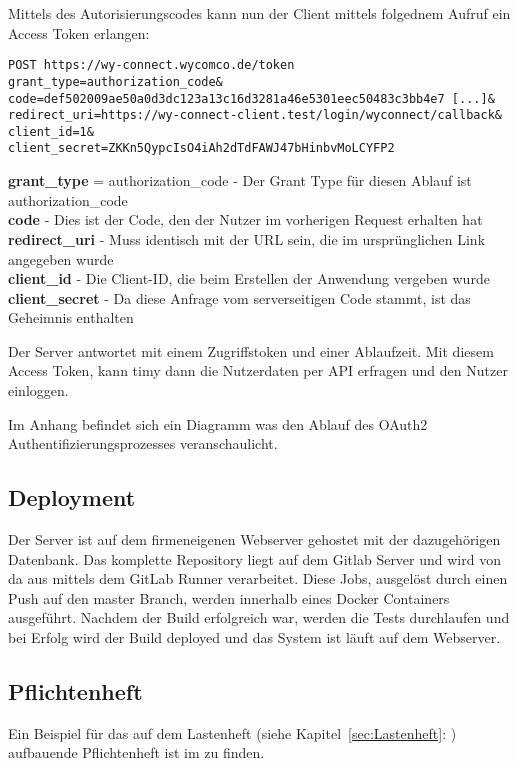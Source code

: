 Mittels des Autorisierungscodes kann nun der Client mittels folgednem Aufruf ein Access Token erlangen: 

\texttt{POST https://wy-connect.wycomco.de/token \\
  grant\_type=authorization\_code\& \\
  code=def502009ae50a0d3dc123a13c16d3281a46e5301eec50483c3bb4e7 [...]\& \\
  redirect\_uri=https://wy-connect-client.test/login/wyconnect/callback\& \\
  client\_id=1\& \\
  client\_secret=ZKKn5QypcIsO4iAh2dTdFAWJ47bHinbvMoLCYFP2}
  
\textbf{grant\_type} = authorization\_code - Der Grant Type für diesen Ablauf ist authorization\_code \\
\textbf{code} - Dies ist der Code, den der Nutzer im vorherigen Request erhalten hat \\
\textbf{redirect\_uri} - Muss identisch mit der URL sein, die im ursprünglichen Link angegeben wurde \\
\textbf{client\_id} - Die Client-ID, die beim Erstellen der Anwendung vergeben wurde \\
\textbf{client\_secret} - Da diese Anfrage vom serverseitigen Code stammt, ist das Geheimnis enthalten

Der Server antwortet mit einem Zugriffstoken und einer Ablaufzeit. Mit diesem Access Token, kann timy dann die Nutzerdaten per API erfragen und den Nutzer einloggen.

Im Anhang  befindet sich ein Diagramm was den Ablauf des OAuth2 Authentifizierungsprozesses veranschaulicht. 

\subsection{Deployment}
\label{sec:Deployment}

Der Server ist auf dem firmeneigenen Webserver gehostet mit der dazugehörigen Datenbank. Das komplette Repository liegt auf dem Gitlab Server und wird von da aus mittels dem GitLab Runner verarbeitet. Diese Jobs, ausgelöst durch einen Push auf den master Branch, werden innerhalb eines Docker Containers ausgeführt. Nachdem der Build erfolgreich war, werden die Tests durchlaufen und bei Erfolg wird der Build deployed und das System ist läuft auf dem Webserver.

\subsection{Pflichtenheft}
\label{sec:Pflichtenheft}

Ein Beispiel für das auf dem Lastenheft (siehe Kapitel~\ref{sec:Lastenheft}: ) aufbauende Pflichtenheft ist im  zu finden.



